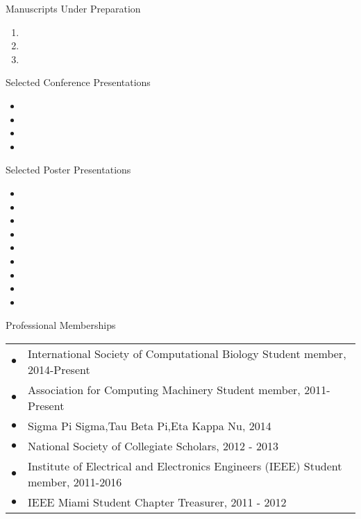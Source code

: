 \documentclass{resume} %
\begin{document}
\begin{rSection}{Manuscripts Under Preparation}
  \begin{enumerate}
    \item {}
    \item {}
    \item {}
  \end{enumerate}
\end{rSection}
\begin{rSection}{Selected Conference Presentations}
  \begin{itemize}
    \item {}
    \item {}
    \item {}
    \item {}
  \end{itemize}
\end{rSection}
\begin{rSection}{Selected Poster Presentations}
  \begin{itemize}
    \setlength\itemsep{0em}
    \item {}
    \item {}
    \item {}
    \item {}
    \item {}
    \item {}
    \item {}
    \item {}
    \item {}
  \end{itemize}
\end{rSection}

\begin{rSection}{Professional Memberships}
  \begin{tabular}{ll}
    $\bullet$ & International Society of Computational Biology Student member, 2014-Present\\
    $\bullet$ & Association for Computing Machinery Student member, 2011-Present \\
    $\bullet$ & Sigma Pi Sigma,Tau Beta Pi,Eta Kappa Nu, 2014 \\
    $\bullet$ & National Society of Collegiate Scholars, 2012 - 2013\\
    $\bullet$ & Institute of Electrical and Electronics Engineers (IEEE) Student member, 2011-2016 \\
    $\bullet$ & IEEE Miami Student Chapter Treasurer, 2011 - 2012\\
  \end{tabular}
\end{rSection}
\end{document}
